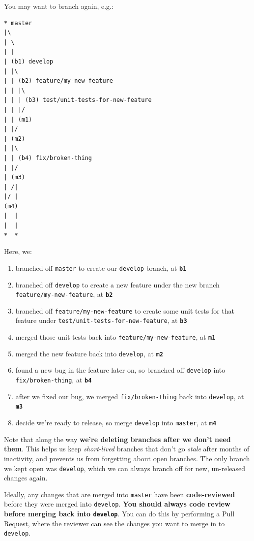 \documentclass[12pt,a4paper,]{article}
\providecommand{\tightlist}{%
  \setlength{\itemsep}{0pt}\setlength{\parskip}{0pt}}
\begin{document}
You may want to branch again, e.g.:

\begin{verbatim}
* master
|\
| \
| |
| (b1) develop
| |\
| | (b2) feature/my-new-feature
| | |\
| | | (b3) test/unit-tests-for-new-feature
| | |/
| | (m1)
| |/
| (m2)
| |\
| | (b4) fix/broken-thing
| |/
| (m3)
| /|
|/ |
(m4)
|  |
|  |
*  *
\end{verbatim}

Here, we:

\begin{enumerate}
\def\labelenumi{\arabic{enumi}.}
\tightlist
\item
  branched off \texttt{master} to create our \texttt{develop} branch, at
  \textbf{\texttt{b1}}
\item
  branched off \texttt{develop} to create a new feature under the new
  branch \texttt{feature/my-new-feature}, at \textbf{\texttt{b2}}
\item
  branched off \texttt{feature/my-new-feature} to create some unit tests
  for that feature under \texttt{test/unit-tests-for-new-feature}, at
  \textbf{\texttt{b3}}
\item
  merged those unit tests back into \texttt{feature/my-new-feature}, at
  \textbf{\texttt{m1}}
\item
  merged the new feature back into \texttt{develop}, at
  \textbf{\texttt{m2}}
\item
  found a new bug in the feature later on, so branched off
  \texttt{develop} into \texttt{fix/broken-thing}, at
  \textbf{\texttt{b4}}
\item
  after we fixed our bug, we merged \texttt{fix/broken-thing} back into
  \texttt{develop}, at \textbf{\texttt{m3}}
\item
  decide we're ready to release, so merge \texttt{develop} into
  \texttt{master}, at \textbf{\texttt{m4}}
\end{enumerate}

Note that along the way \textbf{we're deleting branches after we don't
need them}. This helps us keep \emph{short-lived} branches that don't go
\emph{stale} after months of inactivity, and prevents us from forgetting
about open branches. The only branch we kept open was \texttt{develop},
which we can always branch off for new, un-released changes again.

Ideally, any changes that are merged into \texttt{master} have been
\textbf{code-reviewed} before they were merged into \texttt{develop}.
\textbf{You should always code review before merging back into
\texttt{develop}}. You can do this by performing a Pull Request, where
the reviewer can see the changes you want to merge in to
\texttt{develop}.
\end{document}
